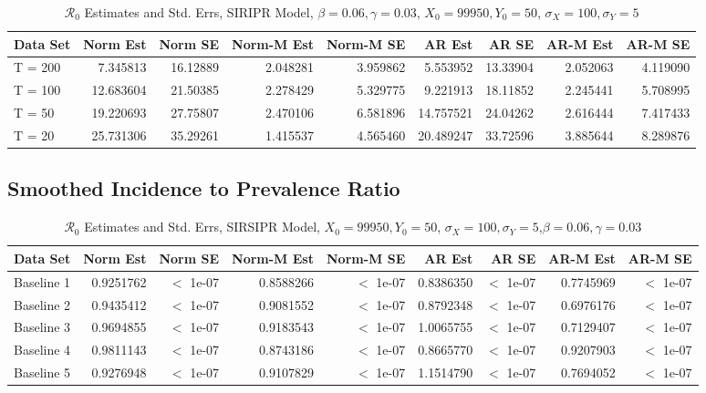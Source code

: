\documentclass[12pt]{article}
\newcommand{\rr}{\ensuremath{\mathcal{R}_0}}
\begin{document}
\begin{table}[H]
	
	\caption{\label{tab:}$\rr$ Estimates and Std. Errs, SIRIPR Model,
		$\beta = 0.06, \gamma = 0.03$, $X_0 = 99950, Y_0 = 50$, $\sigma_X = 100, \sigma_Y = 5$}
	\centering
	\begin{tabular}[t]{l|r|r|r|r|r|r|r|r}
		\hline
		Data Set & Norm Est & Norm SE & Norm-M Est & Norm-M SE & AR Est & AR SE & AR-M Est & AR-M SE\\
		\hline
		T = 200 & 7.345813 & 16.12889 & 2.048281 & 3.959862 & 5.553952 & 13.33904 & 2.052063 & 4.119090\\
		\hline
		T = 100 & 12.683604 & 21.50385 & 2.278429 & 5.329775 & 9.221913 & 18.11852 & 2.245441 & 5.708995\\
		\hline
		T = 50 & 19.220693 & 27.75807 & 2.470106 & 6.581896 & 14.757521 & 24.04262 & 2.616444 & 7.417433\\
		\hline
		T = 20 & 25.731306 & 35.29261 & 1.415537 & 4.565460 & 20.489247 & 33.72596 & 3.885644 & 8.289876\\
		\hline
	\end{tabular}
\end{table}

\subsection{Smoothed Incidence to Prevalence Ratio}

\begin{table}[H]
	
	\caption{\label{tab:}$\rr$ Estimates and Std. Errs, SIRSIPR Model,
		$X_0 = 99950, Y_0 = 50$, $\sigma_X = 100, \sigma_Y = 5$,$\beta = 0.06, \gamma = 0.03$}
	\centering
	\begin{footnotesize}
		\begin{tabular}[t]{l|r|r|r|r|r|r|r|r}
			\hline
			Data Set & Norm Est & Norm SE & Norm-M Est & Norm-M SE & AR Est & AR SE & AR-M Est & AR-M SE\\
			\hline
			Baseline 1 & 0.9251762 & $<$ 1e-07 & 0.8588266 & $<$ 1e-07 & 0.8386350 & $<$ 1e-07 & 0.7745969 & $<$ 1e-07\\
			\hline
			Baseline 2 & 0.9435412 & $<$ 1e-07 & 0.9081552 & $<$ 1e-07 & 0.8792348 & $<$ 1e-07 & 0.6976176 & $<$ 1e-07\\
			\hline
			Baseline 3 & 0.9694855 & $<$ 1e-07 & 0.9183543 & $<$ 1e-07 & 1.0065755 & $<$ 1e-07 & 0.7129407 & $<$ 1e-07\\
			\hline
			Baseline 4 & 0.9811143 & $<$ 1e-07 & 0.8743186 & $<$ 1e-07 & 0.8665770 & $<$ 1e-07 & 0.9207903 & $<$ 1e-07\\
			\hline
			Baseline 5 & 0.9276948 & $<$ 1e-07 & 0.9107829 & $<$ 1e-07 & 1.1514790 & $<$ 1e-07 & 0.7694052 & $<$ 1e-07\\
			\hline
		\end{tabular}
	\end{footnotesize}
\end{table}
\end{document}
